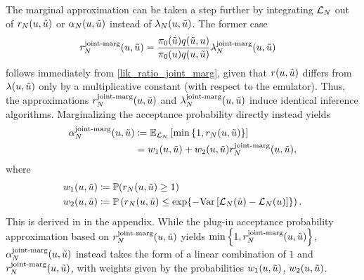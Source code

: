 \documentclass[12pt]{article}
\begin{document}
The marginal approximation can be taken a step further by integrating $\llikEm$ out of 
$\Em[\Ndesign]{\accProbRatio}(\Par, \propPar)$ or $\Em[\Ndesign]{\accProbMH}(\Par, \propPar)$ instead of 
$\Em[\Ndesign]{\likRatio}(\Par, \propPar)$. The former case 
\begin{align}
\llikEmJointMarg[\Ndesign]{\accProbRatio}(\Par, \propPar) 
&= \frac{\priorDens(\propPar) \propDens(\propPar, \Par)}{\priorDens(\Par) \propDens(\Par, \propPar)} 
\llikEmJointMarg[\Ndesign]{\likRatio}(\Par, \propPar)
\label{acc_ratio_joint_marg}
\end{align}
follows immediately from \ref{lik_ratio_joint_marg}, 
given that $\accProbRatio(\Par, \propPar)$ differs from $\likRatio(\Par, \propPar)$ only by a multiplicative 
constant (with respect to the emulator). Thus, the approximations 
$\llikEmJointMarg[\Ndesign]{\accProbRatio}(\Par, \propPar)$ and 
$\llikEmJointMarg[\Ndesign]{\likRatio}(\Par, \propPar)$ induce identical inference algorithms. 
Marginalizing the acceptance probability directly instead yields 
\begin{align}
\llikEmJointMarg[\Ndesign]{\accProbMH}(\Par, \propPar) 
&\Def \E_{\llikEm[\Ndesign]} \left[\min\left\{1, \Em[\Ndesign]{\accProbRatio}(\Par, \propPar)\right\} \right] \\
&= w_1(\Par, \propPar) + w_2(\Par, \propPar) \llikEmJointMarg[\Ndesign]{\accProbRatio}(\Par, \propPar),
\label{acc_prob_joint_marg}
\end{align} 
where 
\begin{align*}
w_1(\Par, \propPar) &\Def \Prob(\Em[\Ndesign]{\accProbRatio}(\Par, \propPar) \geq 1) \\
w_2(\Par, \propPar) &\Def \Prob\left(\Em[\Ndesign]{\accProbRatio}(\Par, \propPar) \leq \Exp{-\Var\left[\llikEm[\Ndesign](\propPar) - \llikEm[\Ndesign](\Par) \right]}\right).
\end{align*}
This is derived in  in the appendix. While the plug-in acceptance probability 
approximation based on $\llikEmJointMarg[\Ndesign]{\accProbRatio}(\Par, \propPar)$ yields 
$\min\left\{1, \llikEmJointMarg[\Ndesign]{\accProbRatio}(\Par, \propPar) \right\}$, 
$\llikEmJointMarg[\Ndesign]{\accProbMH}(\Par, \propPar)$ instead takes the form of a linear combination of 
$1$ and $\llikEmJointMarg[\Ndesign]{\accProbRatio}(\Par, \propPar)$, with weights given by the probabilities 
$w_1(\Par, \propPar)$, $w_2(\Par, \propPar)$.
\end{document}
